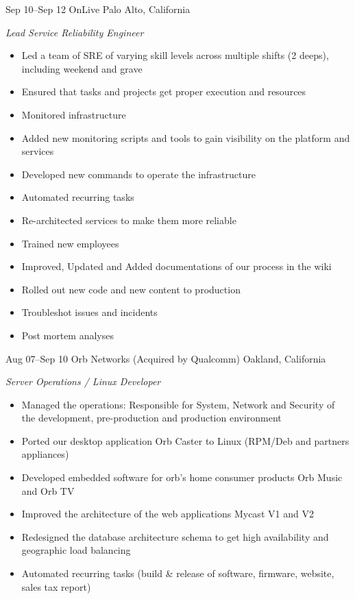 \documentclass[]{friggeri-cv} %
\begin{document}
\begin{entrylist}
\entry
{Sep 10--Sep 12}
{OnLive}
{Palo Alto, California}
{\emph{Lead Service Reliability Engineer} \\
\begin{itemize}
\item Led a team of SRE of varying skill levels across multiple shifts (2 deeps), including weekend and grave
\item Ensured that tasks and projects get proper execution and resources
\item Monitored infrastructure
\item Added new monitoring scripts and tools to gain visibility on the platform and services
\item Developed new commands to operate the infrastructure 
\item Automated recurring tasks
\item Re-architected services to make them more reliable 
\item Trained new employees
\item Improved, Updated and Added documentations of our process in the wiki
\item Rolled out new code and new content to production 
\item Troubleshot issues and incidents
\item Post mortem analyses
\end{itemize}}
\entry
{Aug 07--Sep 10}
{Orb Networks (Acquired by Qualcomm)}
{Oakland, California}
{\emph{Server Operations / Linux Developer} \\
\begin{itemize}
\item Managed the operations: Responsible for System, Network and Security of the development, pre-production and production environment
\item Ported our desktop application Orb Caster to Linux (RPM/Deb and partners appliances)
\item Developed embedded software for orb’s home consumer products Orb Music and Orb TV
\item Improved the architecture of the web applications Mycast V1 and V2
\item Redesigned the database architecture schema to get high availability and geographic load balancing
\item Automated recurring tasks (build \& release of software, firmware, website, sales tax report)

\end{itemize}}
\end{entrylist}
\end{document}
